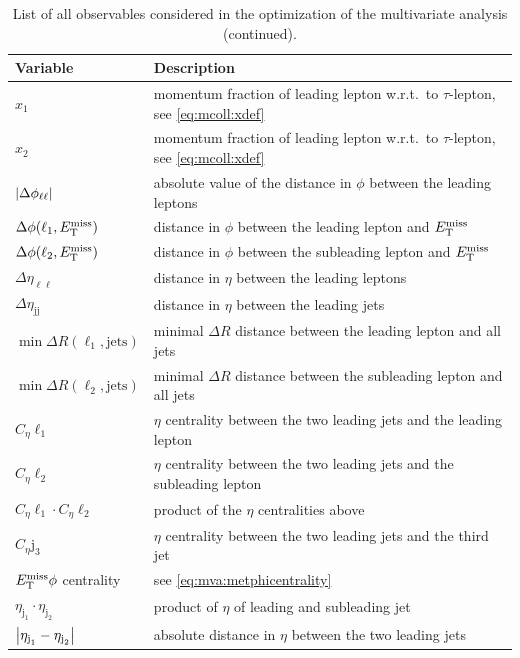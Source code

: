 \begin{table}[htpb]
    \centering
    \caption{List of all observables considered in the optimization of the multivariate analysis (continued).}
    \begin{tabular}{ll}
    	\toprule
	  Variable & Description \\
    \midrule
 $x_1$               & momentum fraction of leading lepton w.r.t.\ to $\tau$-lepton, see \cref{eq:mcoll:xdef} \\
    $x_2$               & momentum fraction of leading lepton w.r.t.\ to $\tau$-lepton, see \cref{eq:mcoll:xdef} \\
    $\left|\Delta \phi_{\ell\ell}\right|$ & absolute value of the distance in $\phi$ between the leading leptons \\
        $\Delta \phi (\ell_1, E_\text{T}^\text{miss})$& distance in $\phi$ between the leading lepton and $E_\text{T}^\text{miss}$ \\
        $\Delta \phi (\ell_2, E_\text{T}^\text{miss})$ & distance in $\phi$ between the subleading lepton and $E_\text{T}^\text{miss}$ \\
    $\Delta \eta_{\ell \ell}$ & distance in $\eta$ between the leading leptons \\
    $\Delta \eta_{\text{jj}}$ & distance in $\eta$ between the leading jets \\
    $\min \Delta R (\ell_1, \text{jets})$ & minimal $\Delta R$ distance between the leading lepton and all jets  \\
    $\min \Delta R (\ell_2, \text{jets})$ & minimal $\Delta R$ distance between the subleading lepton and all jets  \\
    $C_\eta{\ell_1}$ & $\eta$ centrality between the two leading jets and the leading lepton~\cite{SchilloPhd} \\
    $C_\eta{\ell_2}$ & $\eta$ centrality between the two leading jets and the subleading lepton \\
    $C_\eta{\ell_1} \cdot C_\eta{\ell_2}$ & product of the $\eta$ centralities above \\
    $C_\eta{\text{j}_3}$ & $\eta$ centrality between the two leading jets and the third jet\\
    $E_\text{T}^\text{miss} \phi$ centrality & see \cref{eq:mva:metphicentrality} \\
    $\eta_{\text{j}_1} \cdot \eta_{\text{j}_2}$ & product of $\eta$ of leading and subleading jet \\
    $\left|\eta_{\text{j}_1} -\eta_{\text{j}_2}\right|$ & absolute distance in $\eta$ between the two leading jets \\

\end{tabular}
\end{table}
